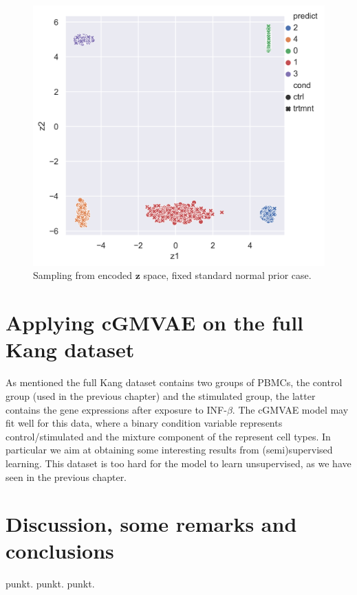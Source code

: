 \documentclass[11pt, a4paper]{report}
\theoremstyle{plain}
\theoremstyle{definition}
\theoremstyle{remark}
\newcommand{\z}{\mathbf{z}}
\begin{document}
\begin{figure}[h]
\centering
\includegraphics[width=1.1\textwidth]{images/blobs_cgmvae_stdprior_z.png}
\caption{Sampling from encoded $\z$ space, fixed standard normal prior case.
}
\label{fig:blobs_nop_z}
\end{figure}

\chapter{Applying cGMVAE on the full Kang dataset}
As mentioned the full Kang dataset contains two groups of PBMCs, 
the control group (used in the previous chapter) and the stimulated group, the latter contains the gene
expressions after exposure to INF-$\beta$.
The cGMVAE model may fit well for this data, where a binary condition variable
represents control/stimulated and the mixture component of the represent cell
types. In particular we aim at obtaining some interesting results from
(semi)supervised learning. This dataset is too hard for the model to learn
unsupervised, as we have seen in the previous chapter.

\chapter{Discussion, some remarks and conclusions}
punkt.
punkt.
punkt.
\end{document}

